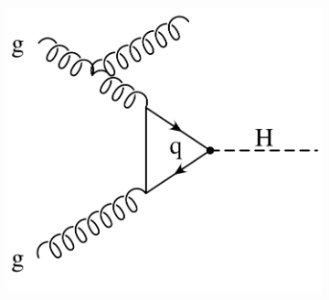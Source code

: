 \begin{figure}
\begin{subfigure}[]{0.3\textwidth}
	\includegraphics[width=\textwidth]{images/gluonfusion_real1.pdf}
	\caption{}
\end{subfigure}


\end{figure}
